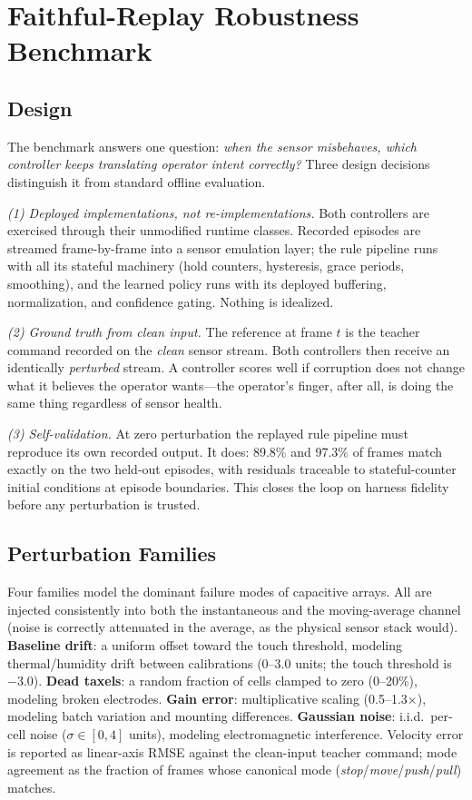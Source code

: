 \documentclass[runningheads]{llncs}
\begin{document}
\section{Faithful-Replay Robustness Benchmark}
\label{sec:benchmark}

\subsection{Design}

The benchmark answers one question: \emph{when the sensor misbehaves, which
controller keeps translating operator intent correctly?}  Three design
decisions distinguish it from standard offline evaluation.

\emph{(1) Deployed implementations, not re-implementations.}
Both controllers are exercised through their unmodified runtime classes.
Recorded episodes are streamed frame-by-frame into a sensor emulation
layer; the rule pipeline runs with all its stateful machinery (hold
counters, hysteresis, grace periods, smoothing), and the learned policy
runs with its deployed buffering, normalization, and confidence gating.
Nothing is idealized.

\emph{(2) Ground truth from clean input.}
The reference at frame $t$ is the teacher command recorded on the
\emph{clean} sensor stream.  Both controllers then receive an identically
\emph{perturbed} stream.  A controller scores well if corruption does not
change what it believes the operator wants---the operator's finger, after
all, is doing the same thing regardless of sensor health.

\emph{(3) Self-validation.}
At zero perturbation the replayed rule pipeline must reproduce its own
recorded output.  It does: 89.8\% and 97.3\% of frames match exactly on
the two held-out episodes, with residuals traceable to stateful-counter
initial conditions at episode boundaries.  This closes the loop on harness
fidelity before any perturbation is trusted.

\subsection{Perturbation Families}

Four families model the dominant failure modes of capacitive arrays.
All are injected consistently into both the instantaneous and the
moving-average channel (noise is correctly attenuated in the average, as
the physical sensor stack would).
\textbf{Baseline drift}: a uniform offset toward the touch threshold,
modeling thermal/humidity drift between calibrations
(0--3.0 units; the touch threshold is $-3.0$).
\textbf{Dead taxels}: a random fraction of cells clamped to zero
(0--20\%), modeling broken electrodes.
\textbf{Gain error}: multiplicative scaling (0.5--1.3$\times$), modeling
batch variation and mounting differences.
\textbf{Gaussian noise}: i.i.d.\ per-cell noise
($\sigma \in [0, 4]$ units), modeling electromagnetic interference.
Velocity error is reported as linear-axis RMSE against the clean-input
teacher command; mode agreement as the fraction of frames whose canonical
mode (\textit{stop}/\textit{move}/\textit{push}/\textit{pull}) matches.
\end{document}
